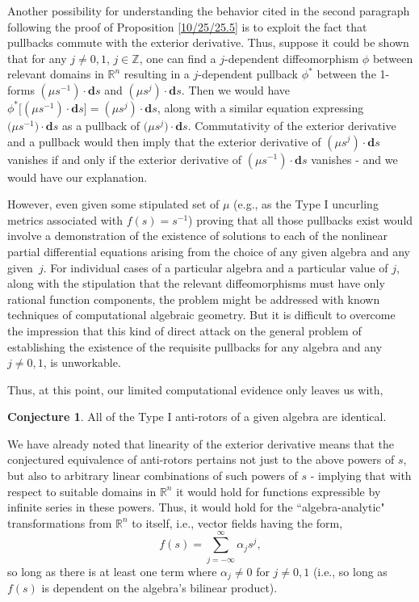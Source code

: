 \documentclass{amsart}
\theoremstyle{definition}
\newtheorem{conjecture}[theorem]{Conjecture}
\numberwithin{theorem}{section}
\numberwithin{equation}{section}
\begin{document}
Another possibility for understanding the behavior cited in the second paragraph following the proof of Proposition \ref{10/25/25.5} is to exploit the fact that pullbacks commute with the exterior derivative.  Thus, suppose it could be shown that for any $j\ne 0,1$, $j\in\mathbb{Z}$, one can find a $j$-dependent diffeomorphism $\phi$  between relevant domains in $\mathbb{R}^n$ resulting in a $j$-dependent pullback $\phi^*$ between the 1-forms $(\mu s^{-1})\cdot \mathbf{d}s$ and $(\mu s^j)\cdot \mathbf{d}s$.   Then we would have $\phi^* \big[(\mu s^{-1})\cdot \mathbf{d}s\big] = (\mu s^j)\cdot \mathbf{d}s$, along with a similar equation expressing $\big(\mu s^{-1}\big)\cdot \mathbf{d}s$ as a pullback of $\big(\mu s^j\big)\cdot \mathbf{d}s$.  Commutativity of the exterior derivative and a pullback would then imply that the exterior derivative of $(\mu s^j)\cdot \mathbf{d}s$ vanishes if and only if the exterior derivative of $(\mu s^{-1})\cdot \mathbf{d}s$ vanishes - and we would have our explanation.

However, even given some stipulated set of $\mu$ (e.g., as the Type I uncurling metrics associated with $f(s)=s^{-1}$) proving that all those pullbacks exist would involve a demonstration of the existence of solutions to each of the nonlinear partial differential equations arising from the choice of any given algebra and any \mbox{given $j$}.  For individual cases of a particular algebra and a particular value of $j$, along with the stipulation that the relevant diffeomorphisms must have only rational function components, the problem might be addressed with known techniques of computational algebraic geometry.  But it is difficult to overcome the impression that this kind of direct attack on the general problem of establishing the existence of the requisite pullbacks for any algebra and any $j\ne 0,1$, is unworkable. 

Thus, at this point, our limited computational evidence only leaves us with,

\begin{conjecture}\label{10/30/25.1} All of the Type I anti-rotors of a given algebra are identical. \end{conjecture}

We have already noted that linearity of the exterior derivative means that the conjectured equivalence of anti-rotors pertains not just to the above powers of $s$, but also to arbitrary linear combinations of such powers of $s$ - implying that with respect to suitable domains in $\mathbb{R}^n$ it would hold for functions expressible by infinite series in these powers.  Thus, it would hold for the ``algebra-analytic" transformations from $\mathbb{R}^n$ to itself, i.e., vector fields having the form, \[ f(s) = \sum_{j=-\infty}^{\infty}\alpha_j s^j,\] so long as there is at least one term where $\alpha_j\ne 0$ for $j\ne 0,1$ (i.e., so long as $f(s)$ is dependent on the algebra's bilinear product).  
\end{document}

